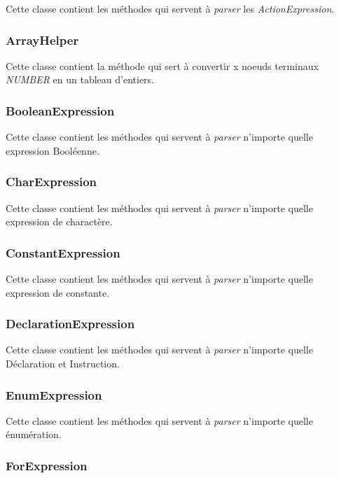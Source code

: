 Cette classe contient les méthodes qui servent à \emph{parser} les \emph{ActionExpression}.

\subsubsection{ArrayHelper}

Cette classe contient la méthode qui sert à convertir x noeuds terminaux \emph{NUMBER} en un tableau d'entiers.

\subsubsection{BooleanExpression}

Cette classe contient les méthodes qui servent à \emph{parser} n'importe quelle expression Booléenne.

\subsubsection{CharExpression}

Cette classe contient les méthodes qui servent à \emph{parser} n'importe quelle expression de charactère.

\subsubsection{ConstantExpression}

Cette classe contient les méthodes qui servent à \emph{parser} n'importe quelle expression de constante.

\subsubsection{DeclarationExpression}

Cette classe contient les méthodes qui servent à \emph{parser} n'importe quelle Déclaration et Instruction.

\subsubsection{EnumExpression}

Cette classe contient les méthodes qui servent à \emph{parser} n'importe quelle énumération.

\subsubsection{ForExpression}


